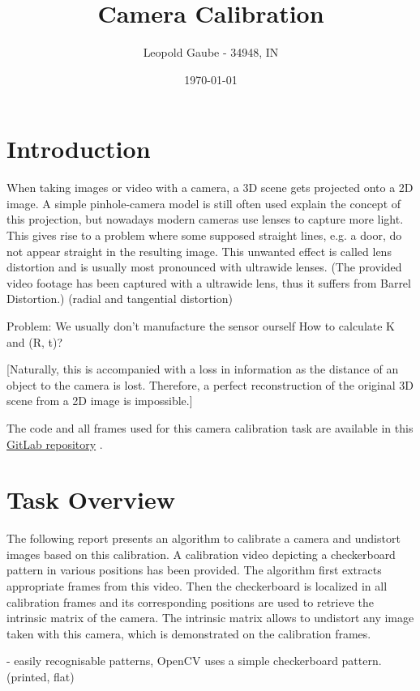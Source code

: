 \documentclass[bibliography=totoc]{scrartcl}
\title{Camera Calibration}
\author{Leopold Gaube - 34948, IN}
\date{\today}
\begin{document}
\maketitle
\tableofcontents

\clearpage

\section{Introduction}

When taking images or video with a camera, a 3D scene gets projected onto a 2D image.
A simple pinhole-camera model is still often used explain the concept of this projection, but nowadays modern cameras use lenses to capture more light.
This gives rise to a problem where some supposed straight lines, e.g. a door, do not appear straight in the resulting image. 
This unwanted effect is called lens distortion and is usually most pronounced with ultrawide lenses.
(The provided video footage has been captured with a ultrawide lens, thus it suffers from Barrel Distortion.)
(radial and tangential distortion)


Problem: We usually don't manufacture the sensor ourself
How to calculate K and (R, t)?

[Naturally, this is accompanied with a loss in information as the distance of an object to the camera is lost.
Therefore, a perfect reconstruction of the original 3D scene from a 2D image is impossible.]

The code and all frames used for this camera calibration task are available in this \href{https://gitlab.com/gaubeleo/camera-calibration}{GitLab repository} \cite{Gitlab}.


\section{Task Overview}
The following report presents an algorithm to calibrate a camera and undistort images based on this calibration.
A calibration video depicting a checkerboard pattern in various positions has been provided.
The algorithm first extracts appropriate frames from this video.
Then the checkerboard is localized in all calibration frames and its corresponding positions are used to retrieve the intrinsic matrix of the camera. 
The intrinsic matrix allows to undistort any image taken with this camera, which is demonstrated on the calibration frames.

- easily recognisable patterns, OpenCV uses a simple checkerboard pattern. (printed, flat)
\end{document}
